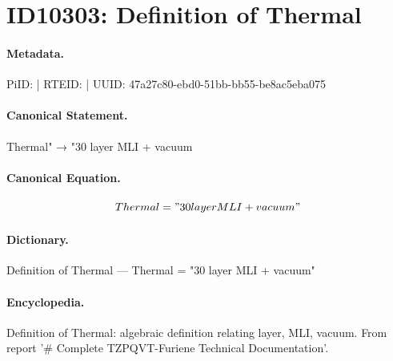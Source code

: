 \section*{ID10303: Definition of Thermal}
\paragraph{Metadata.}
PiID:  | RTEID:  | UUID: 47a27c80-ebd0-51bb-bb55-be8ac5eba075

\paragraph{Canonical Statement.}
Thermal" → "30 layer MLI + vacuum

\paragraph{Canonical Equation.}
\[
Thermal = "30 layer MLI + vacuum"
\]

\paragraph{Dictionary.}
Definition of Thermal — Thermal = "30 layer MLI + vacuum"

\paragraph{Encyclopedia.}
Definition of Thermal: algebraic definition relating layer, MLI, vacuum. From report '\# Complete TZPQVT-Furiene Technical Documentation'.
